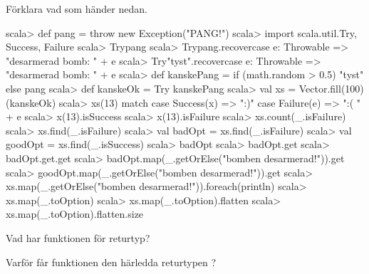 \Subtask Förklara vad som händer nedan.
\begin{REPL}
scala> def pang = throw new Exception("PANG!")
scala> import scala.util.{Try, Success, Failure}
scala> Try{pang}
scala> Try{pang}.recover{case e: Throwable =>   "desarmerad bomb: " + e}
scala> Try{"tyst"}.recover{case e: Throwable => "desarmerad bomb: " + e}
scala> def kanskePang = if (math.random > 0.5) "tyst" else pang
scala> def kanskeOk = Try{ kanskePang}
scala> val xs = Vector.fill(100)(kanskeOk)
scala> xs(13) match {
         case Success(x) => ":)"
         case Failure(e) => ":( " + e
       }
scala> x(13).isSuccess
scala> x(13).isFailure
scala> xs.count(_.isFailure)
scala> xs.find(_.isFailure)
scala> val badOpt = xs.find(_.isFailure)
scala> val goodOpt = xs.find(_.isSuccess)
scala> badOpt
scala> badOpt.get
scala> badOpt.get.get
scala> badOpt.map(_.getOrElse("bomben desarmerad!")).get
scala> goodOpt.map(_.getOrElse("bomben desarmerad!")).get
scala> xs.map(_.getOrElse("bomben desarmerad!")).foreach(println)
scala> xs.map(_.toOption)
scala> xs.map(_.toOption).flatten
scala> xs.map(_.toOption).flatten.size
\end{REPL}


\Subtask Vad har funktionen  för returtyp?

\Subtask Varför får funktionen  den härledda returtypen ?

\SOLUTION


\TaskSolved \what


